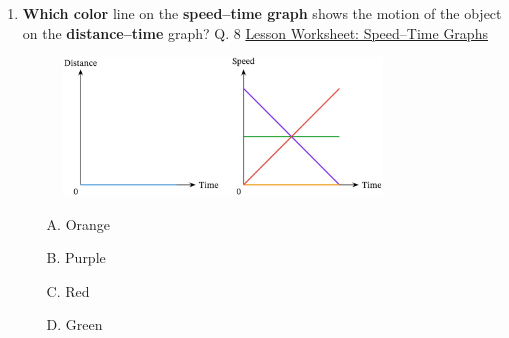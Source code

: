 \documentclass[A4,12pt]{article}
\begin{document}
\begin{enumerate}[label=\bfseries (\arabic*)]
\item \textbf{Which color} line on the \textbf{speed–time graph} shows the motion of the object on the \textbf{distance–time} graph? \cite{Nagwa} Q. 8 \href{https://www.nagwa.com/en/worksheets/257191315239/}{Lesson Worksheet: Speed–Time Graphs}
%
\begin{figure}[H]
    \centering
    \includegraphics[width=0.8\textwidth]{Nagwa_Q8_Speedt.png}
\end{figure}
%
\begin{itemize}
    \item[A.] Orange
    \item[B.] Purple
    \item[C.] Red
    \item[D.] Green
\end{itemize}
%
%














\end{enumerate}
\end{document}
